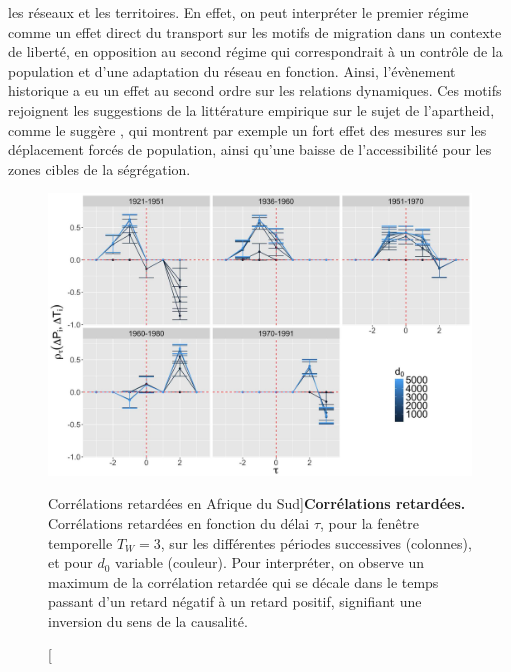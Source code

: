 {les réseaux et les territoires. En effet, on peut interpréter le premier régime comme un effet direct du transport sur les motifs de migration dans un contexte de liberté, en opposition au second régime qui correspondrait à un contrôle de la population et d'une adaptation du réseau en fonction. Ainsi, l'évènement historique a eu un effet au second ordre sur les relations dynamiques. Ces motifs rejoignent les suggestions de la littérature empirique  sur le sujet de l'apartheid, comme le suggère \cite{baffi:tel-01389347}, qui montrent par exemple un fort effet des mesures sur les déplacement forcés de population, ainsi qu'une baisse de l'accessibilité pour les zones cibles de la ségrégation. 
}


%



\begin{figure}
\includegraphics[width=\linewidth]{Figures/Final/4-2-3-fig-causalityregimes-sudafcorrs.jpg}
\caption[Lagged correlations in South Africa][Corrélations retardées en Afrique du Sud]{\label{fig:causalityregimes:sudafcorrs}}{\textbf{Corrélations retardées.}  Corrélations retardées en fonction du délai $\tau$, pour la fenêtre temporelle $T_W=3$, sur les différentes périodes successives (colonnes), et pour $d_0$ variable (couleur). Pour interpréter, on observe un maximum de la corrélation retardée qui se décale dans le temps passant d'un retard négatif à un retard positif, signifiant une inversion du sens de la causalité.\label{fig:causalityregimes:sudafcorrs}}
\end{figure}





